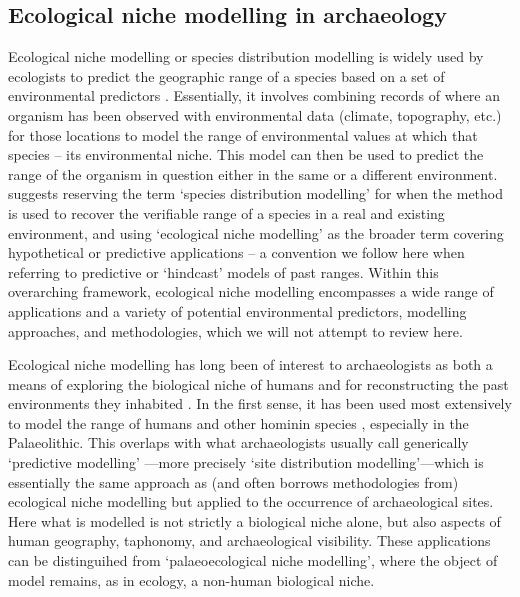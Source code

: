 \documentclass[
  authoryear,
  preprint]{elsarticle}
\begin{document}
\subsection{Ecological niche modelling in
archaeology}\label{ecological-niche-modelling-in-archaeology}

Ecological niche modelling or species distribution modelling is widely
used by ecologists to predict the geographic range of a species based on
a set of environmental predictors \citep{FranklinMiller2009}.
Essentially, it involves combining records of where an organism has been
observed with environmental data (climate, topography, etc.) for those
locations to model the range of environmental values at which that
species -- its environmental niche. This model can then be used to
predict the range of the organism in question either in the same or a
different environment. \citet{CITE} suggests reserving the term `species
distribution modelling' for when the method is used to recover the
verifiable range of a species in a real and existing environment, and
using `ecological niche modelling' as the broader term covering
hypothetical or predictive applications -- a convention we follow here
when referring to predictive or `hindcast' models of past ranges. Within
this overarching framework, ecological niche modelling encompasses a
wide range of applications and a variety of potential environmental
predictors, modelling approaches, and methodologies, which we will not
attempt to review here.

Ecological niche modelling has long been of interest to archaeologists
as both a means of exploring the biological niche of humans and for
reconstructing the past environments they inhabited
\citep{DavidPollyEronen2011, FranklinEtAl2015}. In the first sense, it
has been used most extensively to model the range of humans and other
hominin species
\citep[e.g.][]{BenitoEtAl2017, YousefiEtAl2020, BanksEtAl2021, YaworskyEtAl2024a, YaworskyEtAl2024b, GuranEtAl2024},
especially in the Palaeolithic. This overlaps with what archaeologists
usually call generically `predictive modelling'
\citep{VerhagenWhitley2020}---more precisely `site distribution
modelling'---which is essentially the same approach as (and often
borrows methodologies from) ecological niche modelling but applied to
the occurrence of archaeological sites. Here what is modelled is not
strictly a biological niche alone, but also aspects of human geography,
taphonomy, and archaeological visibility. These applications can be
distinguihed from `palaeoecological niche modelling', where the object
of model remains, as in ecology, a non-human biological niche.
\end{document}

